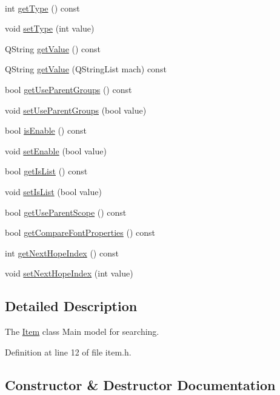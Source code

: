 \begin{DoxyCompactItemize}
$$\item 
int \hyperlink{class_item_a4bec7c4c9b1397ba6ed6e65bcde7b3e8}{get\+Type} () const
\item 
void \hyperlink{class_item_ad1b9dd3edd2a2e33e44a3f84707e96d5}{set\+Type} (int value)
\item 
Q\+String \hyperlink{class_item_ae6ea1a0f342108797321796acb3c9878}{get\+Value} () const
\item 
Q\+String \hyperlink{class_item_a171f7fb92445cf2ebbcc39456a499597}{get\+Value} (Q\+String\+List mach) const
\item 
bool \hyperlink{class_item_a09651004e3d1e354981d45d5988d6073}{get\+Use\+Parent\+Groups} () const
\item 
void \hyperlink{class_item_a28d35e796991b8b314acaffe19cc8f84}{set\+Use\+Parent\+Groups} (bool value)
\item 
bool \hyperlink{class_item_a608527e7705b8f8640e3bdba3fb94415}{is\+Enable} () const
\item 
void \hyperlink{class_item_a058f352e4efb4ba66a85c09e5c59fc9a}{set\+Enable} (bool value)
\item 
bool \hyperlink{class_item_a0aac23b6c71f5e1246db2584340606a2}{get\+Is\+List} () const
\item 
void \hyperlink{class_item_aa289228a65c92ec36e1098b2041ab09a}{set\+Is\+List} (bool value)
\item 
bool \hyperlink{class_item_a1c9646660ee2abe8560fe42c2413f376}{get\+Use\+Parent\+Scope} () const
\item 
bool \hyperlink{class_item_ae7708e01436a0b0595152fea8e77eb0c}{get\+Compare\+Font\+Properties} () const
\item 
int \hyperlink{class_item_a6ccb1728ae39e87cfd1430f252916983}{get\+Next\+Hope\+Index} () const
\item 
void \hyperlink{class_item_a433534d413597c7163d5cf51e94dfdd4}{set\+Next\+Hope\+Index} (int value)
\end{DoxyCompactItemize}


\subsection{Detailed Description}
The \hyperlink{class_item}{Item} class Main model for searching. 

Definition at line 12 of file item.\+h.



\subsection{Constructor \& Destructor Documentation}
\mbox{\label{class_item_aabd972d6d2b789c2ea8d83c127b9bfa6}} 
